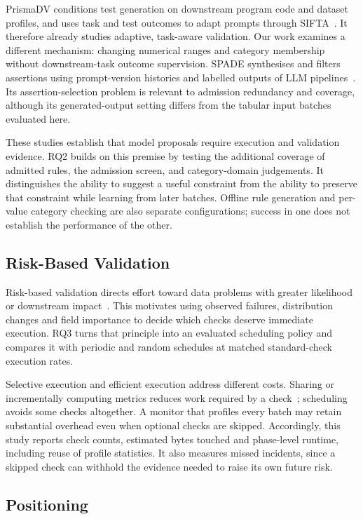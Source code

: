 PrismaDV conditions test generation on downstream program code and dataset profiles, and uses task and test outcomes to adapt prompts through SIFTA~\cite{Chen2026}. It therefore already studies adaptive, task-aware validation. Our work examines a different mechanism: changing numerical ranges and category membership without downstream-task outcome supervision. SPADE synthesises and filters assertions using prompt-version histories and labelled outputs of LLM pipelines~\cite{Shankar2024SPADE}. Its assertion-selection problem is relevant to admission redundancy and coverage, although its generated-output setting differs from the tabular input batches evaluated here.

These studies establish that model proposals require execution and validation evidence. RQ2 builds on this premise by testing the additional coverage of admitted rules, the admission screen, and category-domain judgements. It distinguishes the ability to suggest a useful constraint from the ability to preserve that constraint while learning from later batches. Offline rule generation and per-value category checking are also separate configurations; success in one does not establish the performance of the other.

\subsection{Risk-Based Validation}

Risk-based validation directs effort toward data problems with greater likelihood or downstream impact~\cite{FoidlFelderer2019}. This motivates using observed failures, distribution changes and field importance to decide which checks deserve immediate execution. RQ3 turns that principle into an evaluated scheduling policy and compares it with periodic and random schedules at matched standard-check execution rates.

Selective execution and efficient execution address different costs. Sharing or incrementally computing metrics reduces work required by a check~\cite{Schelter2018}; scheduling avoids some checks altogether. A monitor that profiles every batch may retain substantial overhead even when optional checks are skipped. Accordingly, this study reports check counts, estimated bytes touched and phase-level runtime, including reuse of profile statistics. It also measures missed incidents, since a skipped check can withhold the evidence needed to raise its own future risk.

\subsection{Positioning}

